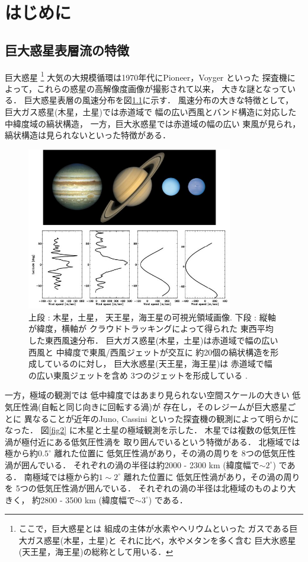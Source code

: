 \documentclass[a4j,12pt,openbib,oneside]{jreport}
\begin{document}
\def\chap1{はじめに}
\chapter{\chap1}
\label{chap:1}
\markright{1 \chap1}
\def\intro1{巨大惑星表層流の特徴}
\section{\intro1}
\label{sec:intro1}
巨大惑星
%
\footnote{ここで，巨大惑星とは
組成の主体が水素やヘリウムといった
ガスである巨大ガス惑星(木星，土星)と
それに比べ，水やメタンを多く含む
巨大氷惑星(天王星，海王星)の総称として用いる．}
%
大気の大規模循環は1970年代にPioneer，Voyger といった
探査機によって，これらの惑星の高解像度画像が撮影されて以来，
大きな謎となっている．
%
巨大惑星表層の風速分布を図\ref{fig1}に示す\citep{showman2009atmospheric}．
%
風速分布の大きな特徴として，
巨大ガス惑星(木星，土星)では赤道域で
幅の広い西風とバンド構造に対応した中緯度域の縞状構造，
一方，巨大氷惑星では赤道域の幅の広い
東風が見られ，縞状構造は見られないといった特徴がある．
%
%
\begin{figure}[h]
  \begin{center}
    \includegraphics[clip,width=9cm]{./fig/intro/fig1.jpg}
    \caption{
      \footnotesize{上段 : 木星，土星，
天王星，海王星の可視光領域画像.
下段 : 縦軸が緯度，横軸が
クラウドトラッキングによって得られた
東西平均した東西風速分布．
巨大ガス惑星(木星，土星)は赤道域で幅の広い西風と
中緯度で東風/西風ジェットが交互に
約20個の縞状構造を形成しているのに対し，
巨大氷惑星(天王星，海王星)は
赤道域で幅の広い東風ジェットを含め
3つのジェットを形成している
\citep{showman2009atmospheric}.
      }
    }
    \label{fig1}
  \end{center}
\end{figure}
\clearpage
%
一方，極域の観測では
低中緯度ではあまり見られない空間スケールの大きい
低気圧性渦(自転と同じ向きに回転する渦)が
存在し，そのレジームが巨大惑星ごとに
異なることが近年のJuno, Cassini といった探査機の観測によって明らかになった．
%
図\ref{fig2} に木星と土星の極域観測を示した．
木星では複数の低気圧性渦が極付近にある低気圧性渦を
取り囲んでいるという特徴がある．
%
北極域では極から約$0.5^\circ$ 離れた位置に
低気圧性渦があり，その渦の周りを
8つの低気圧性渦が囲んでいる．
それぞれの渦の半径は約2000 - 2300 km (緯度幅で$\sim 2^\circ$) である．
%
南極域では極から約$1 \sim 2 ^\circ$ 離れた位置に
低気圧性渦があり，その渦の周りを
5つの低気圧性渦が囲んでいる．
それぞれの渦の半径は北極域のものより大きく，
約2800 - 3500 km (緯度幅で$\sim 3^\circ$) である\citep{Adriani2018}．
\end{document}
